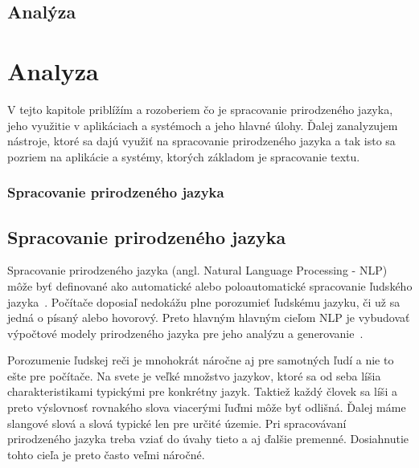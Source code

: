 \newpage
%
%
{
	\section{Analýza} 
}
{
	\chapter{Analyza}
}
V tejto kapitole priblížím a rozoberiem čo je spracovanie prirodzeného jazyka, jeho využitie v aplikáciach a systémoch a jeho hlavné úlohy. Ďalej zanalyzujem nástroje, ktoré sa dajú využiť na spracovanie prirodzeného jazyka a tak isto sa pozriem na aplikácie a systémy, ktorých základom je spracovanie textu.

%
%
{
	\subsection{Spracovanie prirodzeného jazyka}
}
{
	\section{Spracovanie prirodzeného jazyka}
}
\label{subsec:nlp}
Spracovanie prirodzeného jazyka (angl. Natural Language Processing - NLP) môže byť definované ako automatické alebo poloautomatické spracovanie ľudského jazyka~\cite{Copestake2004}. Počítače doposiaľ nedokážu plne porozumieť ľudskému jazyku, či už sa jedná o písaný alebo hovorový. Preto hlavným hlavným cieľom NLP je vybudovať výpočtové modely prirodzeného jazyka pre jeho analýzu a generovanie~\cite{Bharati1995}.

Porozumenie ľudskej reči je mnohokrát náročne aj pre samotných ľudí a nie to ešte pre počítače. Na svete je veľké množstvo jazykov, ktoré sa od seba líšia charakteristikami typickými pre konkrétny jazyk. Taktiež každý človek sa líši a preto výslovnosť rovnakého slova viacerými ľuďmi môže byť odlišná. Ďalej máme slangové slová a slová typické len pre určité územie. Pri spracovávaní prirodzeného jazyka treba vziať do úvahy tieto a aj ďalšie premenné. Dosiahnutie tohto cieľa je preto často veľmi náročné.

